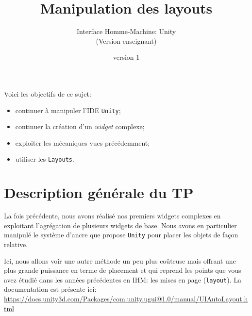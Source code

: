 \documentclass[a4paper,10pt]{article}
\newenvironment{attention}%
{\begin{tcolorbox}[breakable,colback=green!25!white,colframe=red!55!black,title=Attention]}%
{\end{tcolorbox}}
\begin{document}
	


\title{\vspace*{-1cm}Manipulation des layouts}
\author{\vspace*{-1.5cm}Interface Homme-Machine: Unity
\begin{ensnote}
	(Version enseignant)
\end{ensnote}
}
\date{\vspace*{-1.5cm}version 1}
\maketitle
\thispagestyle{fancy}

Voici les objectifs de ce sujet:
\begin{itemize}
	\item continuer à manipuler l'IDE \texttt{Unity};
	\item continuer la création d'un \textit{widget} complexe;
	\item exploiter les mécaniques vues précédemment;
	\item utiliser les \texttt{Layouts}.
\end{itemize}


%	

\section{Description générale du TP}

La fois précédente, nous avons réalisé nos premiers widgets complexes en exploitant l'agrégation de plusieurs widgets de base. Nous avons en particulier manipulé le système d'ancre que propose \texttt{Unity} pour placer les objets de façon relative.

Ici, nous allons voir une autre méthode un peu plus coûteuse mais offrant une plus grande puissance en terme de placement et qui reprend les points que vous avez étudié dans les années précédentes en IHM: les mises en page (\texttt{layout}). La documentation est présente ici: \url{https://docs.unity3d.com/Packages/com.unity.ugui@1.0/manual/UIAutoLayout.html}
\end{document}
